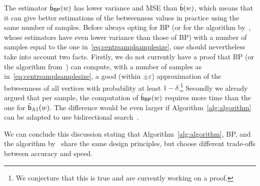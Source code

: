 %
%
%
%

The estimator $\tilde{\mathsf{b}}_{\mathsf{BP}}(w)$ has lower variance and MSE than
$\tilde{\mathsf{b}}(w)$, which means that it can give better estimations of the
betweenness values in practice using the same number of samples. Before always
opting for \textsf{BP} (or for the algorithm by~\citet{GeisbergerSS08}, whose
estimators have even lower variance than those of \textsf{BP}) with a number of
samples equal to the one in~\eqref{eq:centrsamplsamplesize}, one should
nevertheless take into account two facts. Firstly, we do not currently have a
proof that \textsf{BP} (or the algorithm from~\citep{GeisbergerSS08}) can
compute, with a number of samples as in~\eqref{eq:centrsamplsamplesize},
a good (within $\pm\varepsilon$) approximation of the betweenness of all
vertices with probability at least $1-\delta$.\footnote{We conjecture that this
is true and are currently working on a proof.}
Secondly we already argued that per sample, the computation of
$\tilde{\mathsf{b}}_{\mathsf{BP}}(w)$ requires more time than the one for
$\tilde{\mathsf{b}}_{\mathrm{A1}}(w)$. The difference would be even larger if
Algorithm~\ref{alg:algorithm} can be adapted to use bidirectional
search~\citep{KaindlK97,Pohl69}. 

We can conclude this discussion stating that Algorithm~\ref{alg:algorithm},
\textsf{BP}, and the algorithm by~\citet{GeisbergerSS08} share the same design
principles, but choose different trade-offs between accuracy and speed.  

